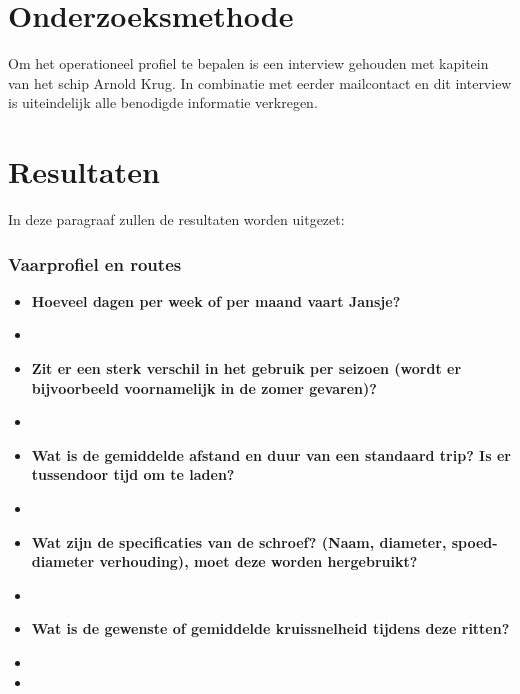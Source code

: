 \section{Onderzoeksmethode}

\noindent Om het operationeel profiel te bepalen is een interview gehouden met kapitein van het schip Arnold Krug. In combinatie met eerder mailcontact en dit interview is uiteindelijk alle benodigde informatie verkregen.

\section{Resultaten}

In deze paragraaf zullen de resultaten worden uitgezet:

\subsubsection*{Vaarprofiel en routes}
 \begin{itemize}
    \item \textbf{Hoeveel dagen per week of per maand vaart Jansje?}
    \item 
    \item \textbf{Zit er een sterk verschil in het gebruik per seizoen (wordt er bijvoorbeeld voornamelijk in de zomer gevaren)?}
    \item  
    \item \textbf{Wat is de gemiddelde afstand en duur van een standaard trip? Is er tussendoor tijd om te laden?}
    \item 
    \item \textbf{Wat zijn de specificaties van de schroef? (Naam, diameter, spoed-diameter verhouding), moet deze worden hergebruikt?}
    \item  
    \item \textbf{Wat is de gewenste of gemiddelde kruissnelheid tijdens deze ritten?}
    \item \item 
\end{itemize}

